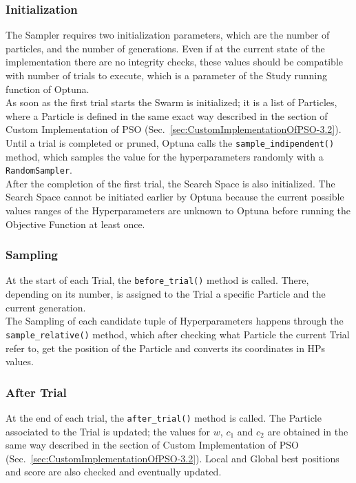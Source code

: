 \subsubsection{Initialization}
The Sampler requires two initialization parameters, which are the number of particles, and the number of generations. 
Even if at the current state of the implementation there are no integrity checks, these values should be compatible with number of trials to execute, which is a parameter of the Study running function of Optuna. 
\\[0.3cm]As soon as the first trial starts the Swarm is initialized; it is a list of Particles, where a Particle is defined in the same exact way described in the section of Custom Implementation of PSO (Sec.~\ref{sec:CustomImplementationOfPSO-3.2}).
\\[0.3cm]Until a trial is completed or pruned, Optuna calls the \texttt{sample\_indipendent()} method, which samples the value for the hyperparameters randomly with a \texttt{RandomSampler}.
\\[0.3cm]After the completion of the first trial, the Search Space is also initialized. The Search Space cannot be initiated earlier by Optuna because the current possible values ranges of the Hyperparameters are unknown to Optuna before running the Objective Function at least once.

\subsubsection{Sampling}

At the start of each Trial, the \texttt{before\_trial()} method is called. There, depending on its number, is assigned to the Trial a specific Particle and the current generation.
\\[0.3cm]The Sampling of each candidate tuple of Hyperparameters happens through the \newline\texttt{sample\_relative()} method, which after checking what Particle the current Trial refer to, get the position of the Particle and converts its coordinates in HPs values.

\subsubsection{After Trial}

At the end of each trial, the \texttt{after\_trial()} method is called.
The Particle associated to the Trial is updated; the values for $w$, $c_1$ and $c_2$ are obtained in the same way described in the section of Custom Implementation of PSO (Sec.~\ref{sec:CustomImplementationOfPSO-3.2}).
Local and Global best positions and score are also checked and eventually updated.

